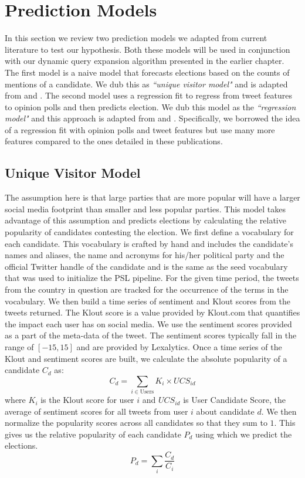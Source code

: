 \chapter{Prediction Models}
In this section we review two prediction models we adapted from current literature to test our hypothesis. 
Both these models will be used in conjunction with our dynamic query expansion algorithm presented in the earlier
chapter.
The first model is a naive model that forecasts elections based on the counts of mentions of a candidate.
We dub this as  \emph{``unique visitor model"} and is adapted from \cite{saez2011total} and \cite{tumasjan2010predicting}.
The second model uses a regression fit to regress from tweet features to opinion polls and then predicts election. 
We dub this model as the \emph{``regression model"} and this approach
is adapted from \cite{bermingham2011using} and \cite{o2010tweets}.
Specifically, we borrowed the idea of a regression fit with opinion polls and tweet features but use many more features compared to the ones detailed in these publications. 

\section{Unique Visitor Model}
The assumption here is that
large parties that are more popular will have a larger social media footprint than smaller and less popular parties. 
This model takes advantage of this assumption and predicts elections by calculating the relative popularity of candidates contesting the election.
We first define a vocabulary for each candidate. 
This vocabulary is crafted by hand and includes the candidate's names and aliases, the name and acronyms for his/her political party and the official Twitter handle of the candidate and is the
same as the seed vocabulary that was used to initialize the PSL pipeline.
For the given time period, the tweets from the country in question are tracked for the occurrence of the terms in the vocabulary.
We then build a time series of sentiment and Klout scores from the tweets returned.
The Klout score is a value provided by Klout.com that quantifies the impact each user has on social media. 
We use the sentiment scores provided as a part of the meta-data of the tweet.
The sentiment scores typically fall in the range of $[-15,15]$ and are provided by Lexalytics.
Once a time series of the Klout and sentiment scores are built, we calculate the absolute popularity 
of a candidate $C_d$ as:
\begin{equation}
{C_d} = \sum_{i \in \textrm{Users}} K_i \times UCS_{id}
\end{equation}
where $K_i$ is the Klout score for user $i$ and $UCS_{id}$ is User Candidate Score, the average of sentiment scores for all tweets from user $i$ about candidate $d$.
We then normalize the popularity scores across all candidates so that they sum to $1$.
This gives us the relative popularity of each candidate $P_d$ using which we predict the elections.
\begin{equation}
{P_d} = \sum_i \frac{C_d}{C_i}
\end{equation}

